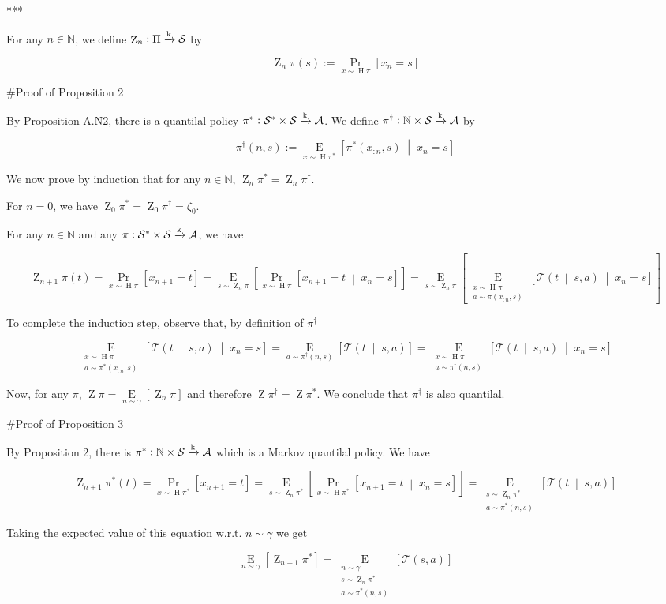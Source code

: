 \documentclass[a4paper]{article}
\newcommand{\AP}[1]{\left(#1\right)}
\newcommand{\AB}[1]{\left[#1\right]}
\newcommand{\APM}[2]{\left(#1\;\middle\vert\;#2\right)}
\newcommand{\ABM}[2]{\left[#1\;\middle\vert\;#2\right]}
\newcommand{\Pa}[2]{\underset{#1}{\operatorname{Pr}}\AB{#2}}
\newcommand{\CP}[3]{\underset{#1}{\operatorname{Pr}}\ABM{#2}{#3}}
\newcommand{\Ea}[2]{\underset{#1}{\operatorname{E}}\AB{#2}}
\newcommand{\CE}[3]{\underset{#1}{\operatorname{E}}\ABM{#2}{#3}}
\newcommand{\Nats}{\mathbb{N}}
\newcommand{\K}{\xrightarrow{\textnormal{k}}}
\newcommand{\A}{\mathcal{A}}
\newcommand{\St}{\mathcal{S}}
\newcommand{\T}{\mathcal{T}}
\DeclareMathOperator{\Hi}{H}
\DeclareMathOperator{\Z}{Z}
\begin{document}
***

For any $n\in\Nats$, we define $\Z_n: \Pi \K \St$ by 

$$\Z_n{\pi}(s) := \Pa{x\sim\Hi{\pi}}{x_n=s}$$

\#Proof of Proposition 2

By Proposition A.N2, there is a quantilal policy $\pi^*: \St^* \times \St \K \A$. We define $\pi^\dagger: \Nats \times \St \K \A$ by

$$\pi^\dagger(n,s):=\CE{x\sim\Hi{\pi^*}}{\pi^*(x_{:n},s)}{x_n=s}$$

We now prove by induction that for any $n\in\Nats$, $\Z_n{\pi^*} = \Z_n{\pi^\dagger}$.

For $n=0$, we have $\Z_0{\pi^*} = \Z_0{\pi^\dagger} = \zeta_0$.

For any $n \in \Nats$ and any $\pi: \St^* \times \St \K \A$, we have

$$\Z_{n+1}{\pi}(t) = \Pa{x\sim\Hi{\pi}}{x_{n+1}=t} = \Ea{s\sim\Z_n{\pi}}{\CP{x\sim\Hi{\pi}}{x_{n+1} = t}{x_n=s}} = \Ea{s\sim\Z_n{\pi}}{\CE{\substack{x\sim\Hi{\pi} \\ a\sim\pi\AP{x_{:n},s}}}{\T\APM{t}{s,a}}{x_n=s}}$$

To complete the induction step, observe that, by definition of $\pi^\dagger$


$$\CE{\substack{x\sim\Hi{\pi} \\ a\sim\pi^*\AP{x_{:n},s}}}{\T\APM{t}{s,a}}{x_n=s} = \Ea{a\sim\pi^\dagger\AP{n,s}}{\T\APM{t}{s,a}}=\CE{\substack{x\sim\Hi{\pi} \\ a\sim\pi^\dagger\AP{n,s}}}{\T\APM{t}{s,a}}{x_n=s}$$

Now, for any $\pi$, $\Z{\pi}=\Ea{n\sim\gamma}{\Z_n{\pi}}$ and therefore $\Z{\pi^\dagger} = \Z{\pi^*}$. We conclude that $\pi^\dagger$ is also quantilal.

\#Proof of Proposition 3

By Proposition 2, there is $\pi^*: \Nats \times \St \K \A$ which is a Markov quantilal policy. We have

$$\Z_{n+1}{\pi^*}(t) = \Pa{x\sim\Hi{\pi^*}}{x_{n+1}=t} = \Ea{s\sim\Z_n{\pi^*}}{\CP{x\sim\Hi{\pi^*}}{x_{n+1} = t}{x_n=s}} = \Ea{\substack{s\sim\Z_n{\pi^*}\\a\sim\pi^*\AP{n,s}}}{\T\APM{t}{s,a}}$$

Taking the expected value of this equation w.r.t. $n\sim\gamma$ we get

$$\Ea{n\sim\gamma}{\Z_{n+1}{\pi^*}} = \Ea{\substack{n\sim\gamma\\s\sim\Z_n{\pi^*}\\a\sim\pi^*\AP{n,s}}}{\T(s,a)}$$
\end{document}
